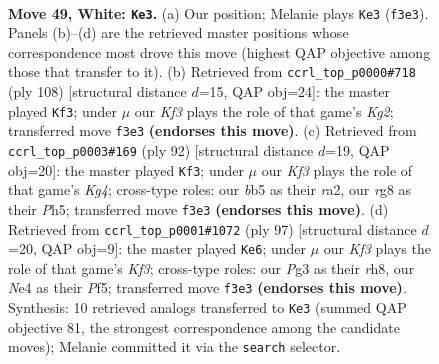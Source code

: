 \documentclass[11pt]{article}
\begin{document}
\clearpage

\begin{figure}[p]\centering
\begin{subfigure}{0.46\textwidth}\centering
\resizebox{\linewidth}{!}{%
\newchessgame
\chessboard[
  setfen={6r1/4k3/8/1b2p3/pP2N3/R4KP1/8/8 w - - 11 49},
  showmover=false,
  pgfstyle=straightmove, color=movearrow, markmove={f3-e3}
]}
\caption{}
\end{subfigure}\hfill
\begin{subfigure}{0.46\textwidth}\centering
\resizebox{\linewidth}{!}{%
\newchessgame
\chessboard[
  setfen={7k/r7/5pR1/4bN1p/8/7P/5PK1/8 w - - 16 55},
  showmover=false,
  pgfstyle=straightmove, color=movearrow, markmove={g2-f3}
]}
\caption{}
\end{subfigure}
\\[4pt]
\begin{subfigure}{0.46\textwidth}\centering
\resizebox{\linewidth}{!}{%
\newchessgame
\chessboard[
  setfen={8/8/p3kb2/7P/P5K1/4N1P1/r3p3/4R3 w - - 4 47},
  showmover=false,
  pgfstyle=straightmove, color=movearrow, markmove={g4-f3}
]}
\caption{}
\end{subfigure}\hfill
\begin{subfigure}{0.46\textwidth}\centering
\resizebox{\linewidth}{!}{%
\newchessgame
\chessboard[
  setfen={7R/8/2r2k2/4pp1p/8/2P5/3BK3/8 b - - 1 49},
  showmover=false,
  pgfstyle=straightmove, color=movearrow, markmove={f6-e6}
]}
\caption{}
\end{subfigure}
\caption{\textbf{Move 49, White: \texttt{Ke3}.} (a) Our position; Melanie plays \texttt{Ke3} (\texttt{f3e3}). Panels (b)--(d) are the retrieved master positions whose correspondence most drove this move (highest QAP objective among those that transfer to it). (b) Retrieved from \texttt{ccrl\_top\_p0000\#718} (ply 108) [structural distance $d$=15, QAP obj=24]: the master played \texttt{Kf3}; under $\mu$ our \emph{Kf3} plays the role of that game's \emph{Kg2}; transferred move \texttt{f3e3} \textbf{(endorses this move)}. (c) Retrieved from \texttt{ccrl\_top\_p0003\#169} (ply 92) [structural distance $d$=19, QAP obj=20]: the master played \texttt{Kf3}; under $\mu$ our \emph{Kf3} plays the role of that game's \emph{Kg4}; cross-type roles: our \emph{b}b5 as their \emph{r}a2, our \emph{r}g8 as their \emph{P}h5; transferred move \texttt{f3e3} \textbf{(endorses this move)}. (d) Retrieved from \texttt{ccrl\_top\_p0001\#1072} (ply 97) [structural distance $d$=20, QAP obj=9]: the master played \texttt{Ke6}; under $\mu$ our \emph{Kf3} plays the role of that game's \emph{Kf3}; cross-type roles: our \emph{P}g3 as their \emph{r}h8, our \emph{N}e4 as their \emph{P}f5; transferred move \texttt{f3e3} \textbf{(endorses this move)}. Synthesis: 10 retrieved analogs transferred to \texttt{Ke3} (summed QAP objective 81, the strongest correspondence among the candidate moves); Melanie committed it via the \texttt{search} selector.}
\label{fig:thought-m96}
\end{figure}
\end{document}
